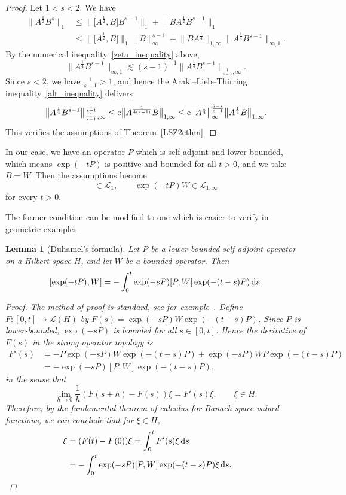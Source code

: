 \documentclass[pdftex]{sigma}
\numberwithin{equation}{section}
\newtheorem{Lemma}[Theorem]{Lemma}
\begin{document}
\begin{proof}
 Let $1<s<2.$ We have
 \begin{align*}
 \big\|A^{\frac12}B^s\big\|_1 &{}\leq \big\|\big[A^{\frac12},B\big]B^{s-1}\big\|_1+\big\|BA^{\frac12}B^{s-1}\big\|_1 \\
 &{}\leq \big\|\big[A^{\frac12},B\big]\big\|_1\|B\|_{\infty}^{s-1}+\big\|BA^{\frac14}\big\|_{1,\infty}\big\|A^{\frac14}B^{s-1}\big\|_{\infty,1}.
 \end{align*}
 By the numerical inequality~\eqref{zeta_inequality} above,
 \[
 \big\|A^{\frac14}B^{s-1}\big\|_{\infty,1} \lesssim (s-1)^{-1}\big\|A^{\frac14}B^{s-1}\big\|_{\frac{1}{s-1},\infty}.
 \]
 Since $s<2$, we have $\frac{1}{s-1}>1$, and hence the Araki--Lieb--Thirring inequality~\eqref{alt_inequality} delivers
 \[
 \big\|A^{\frac14}B^{s-1}\big\|_{\frac{1}{s-1},\infty}^{\frac{1}{s-1}} \leq {\rm e}\big\|A^{\frac{1}{4(s-1)}}B\big\|_{1,\infty}\leq {\rm e}\big\|A^{\frac14}\big\|_{\infty}^{\frac{2-s}{s-1}}\big\|A^{\frac14}B\big\|_{1,\infty}.
 \]
 This verifies the assumptions of Theorem~\ref{LSZ2ethm}.
\end{proof}

In our case, we have an operator $P$ which is self-adjoint and lower-bounded, which means $\exp(-tP)$ is positive and bounded for all $t>0$, and we take $B=W$. Then the assumptions become
\begin{equation*}%
 [\exp(-tP),W] \in \mathcal{L}_1,\qquad \exp(-tP)W \in \mathcal{L}_{1,\infty}
\end{equation*}
for every $t>0.$

The former condition can be modified to one which is easier to verify in geometric examples.
\begin{Lemma}[Duhamel's formula]\label{Duhamel formula}
Let $P$ be a lower-bounded self-adjoint operator on a Hilbert space $H$, and let $W$ be a bounded operator. Then
\[
[\exp(-tP),W] = -\int_0^t \exp(-sP)[P,W]\exp(-(t-s)P)\,{\rm d}s.
\]
\begin{proof}
The method of proof is standard, see for example~\cite[Lemma~5.2]{AzamovCarey2009}. Define $F\colon [0,t] \to \mathcal{L}(H)$ by $F(s) = \exp(-sP)W\exp(-(t-s)P)$. Since $P$ is lower-bounded, $\exp(-sP)$ is bounded for all $s \in [0,t]$. Hence the derivative of $F(s)$ in the strong operator topology is
\begin{align*}
F'(s) &= -P\exp(-sP)W\exp(-(t-s)P) + \exp(-sP)W P \exp(-(t-s)P) \\
&= -\exp(-sP)[P,W]\exp(-(t-s)P),
\end{align*} in the sense that \[\lim_{h\to 0} \frac{1}{h}(F(s+h)-F(s))\xi = F'(s)\xi, \qquad \xi \in H.\]
Therefore, by the fundamental theorem of calculus for Banach space-valued functions, we can conclude that for $\xi \in H$, \begin{align*}
[\exp(-tP),W]\xi &= (F(t)-F(0))\xi= \int_{0}^t F'(s) \xi \,{\rm d}s\\
&= -\int_0^t \exp(-sP)[P,W]\exp(-(t-s)P) \xi \,{\rm d}s.
\tag*{\qed}
\end{align*}
\renewcommand{\qed}{}
\end{proof}
\end{Lemma}
\end{document}
